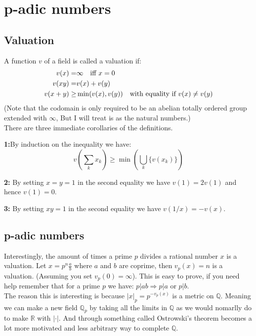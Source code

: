 
\section{p-adic numbers}
\subsection{Valuation}
A function $v$ of a field is called a valuation if:
\begin{equation*}
\begin{aligned}
	v(x) =& \infty \text{\quad iff } x = 0 \\
	v(xy) =& v(x)+v(y) \\
	v(x+y) \geq& \min(v(x),v(y)) \text{\quad with equality if } v(x) \neq v(y) \\
\end{aligned}
\end{equation*}
(Note that the codomain is only required to be an abelian totally ordered group extended with $\infty$,
But I will treat is as the natural numbers.)
\\

There are three immediate corollaries of the definitions.

{\textbf{1:}}By induction on the inequality we have:
\[v\left(\sum_k x_k\right) \geq \min\left(\bigcup_k \{v(x_k)\}\right)\]

{\textbf{2:}} By setting $x=y=1$ in the second equality we have $v(1)=2v(1)$ and hence $v(1) = 0$.

{\textbf{3:}} By setting $xy=1$ in the second equality we have $v(1/x)=-v(x)$.

\subsection{p-adic numbers}
Interestingly, the amount of times a prime $p$ divides a rational number $x$ is a valuation.
Let $x = p^n\frac{a}{b}$ where $a$ and $b$ are coprime, then $v_p(x) = n$ is a valuation.
(Assuming you set $v_p(0) = \infty$).
This is easy to prove, if you need help remember that for a prime $p$ we have: $p | ab \Rightarrow p|a$ or $p|b$.
\\

The reason this is interesting is because $|x|_p = p^{-v_p(x)}$ is a metric on $\mathbb{Q}$.
Meaning we can make a new field $\mathbb{Q}_p$ by taking all the limits in $\mathbb{Q}$ as we would nomarlly do to make $\mathbb{R}$ with $|\cdot|$.
And through something called Ostrowski's theorem becomes a lot more motivated and less arbitrary way to complete $\mathbb{Q}$.
\\

